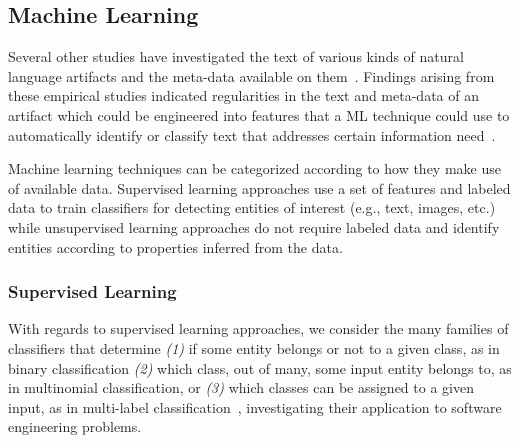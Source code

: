 \subsection{Machine Learning }
\label{cp2:machine-learning}



Several other studies have investigated the text 
of various kinds of natural language artifacts and 
the meta-data available on them~\cite{Ko2006, Maalej2013, Arya2019}.
Findings arising from these empirical studies
indicated regularities in the text and meta-data of 
an artifact which could be engineered into 
features that a  \acf{ML} technique could use to automatically identify or classify
text that addresses certain information need~\cite{Bavota2016}. 



Machine learning techniques can be categorized 
according to how they make use of available data. 
Supervised learning approaches use a set of features and labeled data
to train classifiers for detecting entities of interest (e.g., text, images, etc.)
while unsupervised learning approaches do not require labeled data and 
identify entities according to properties inferred from the data.



\subsubsection{Supervised Learning }
\label{cp2:supervised}


With regards to supervised learning approaches, 
we consider the many families of classifiers that 
determine
\textit{(1)} if some entity belongs or not to a given class, as in binary classification
\textit{(2)} which class, out of many, some input entity belongs to, as in multinomial classification, or
\textit{(3)} which classes can be assigned to a given input, as in multi-label classification~\cite{alpaydin2020ml},
 investigating their application to software engineering problems.






